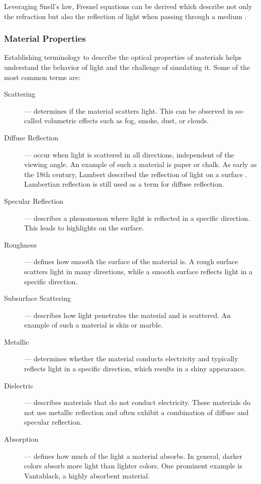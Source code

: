 Leveraging Snell's law, Fresnel equations can be derived which describe not only the refraction but also the reflection of light when passing through a medium \cite{fowles1989introduction}.

\subsubsection{Material Properties}

Establishing terminology to describe the optical properties of materials helps understand the behavior of light and the challenge of simulating it. Some of the most common terms are:

\begin{description}
  \item[Scattering] — determines if the material scatters light. This can be observed in so-called volumetric effects such as fog, smoke, dust, or clouds.
  \item[Diffuse Reflection] — occur when light is scattered in all directions, independent of the viewing angle. An example of such a material is paper or chalk. As early as the 18th century, Lambert described the reflection of light on a surface \cite{lambert1760photometria}. Lambertian reflection is still used as a term for diffuse reflection.
  \item[Specular Reflection] — describes a phenomenon where light is reflected in a specific direction. This leads to highlights on the surface.
  \item[Roughness] — defines how smooth the surface of the material is. A rough surface scatters light in many directions, while a smooth surface reflects light in a specific direction.
  \item[Subsurface Scattering] — describes how light penetrates the material and is scattered. An example of such a material is skin or marble.
  \item[Metallic] — determines whether the material conducts electricity and typically reflects light in a specific direction, which results in a shiny appearance.
  \item[Dielectric] — describes materials that do not conduct electricity. These materials do not use metallic reflection and often exhibit a combination of diffuse and specular reflection.
  \item[Absorption] — defines how much of the light a material absorbs. In general, darker colors absorb more light than lighter colors. One prominent example is Vantablack, a highly absorbent material.

\end{description}
